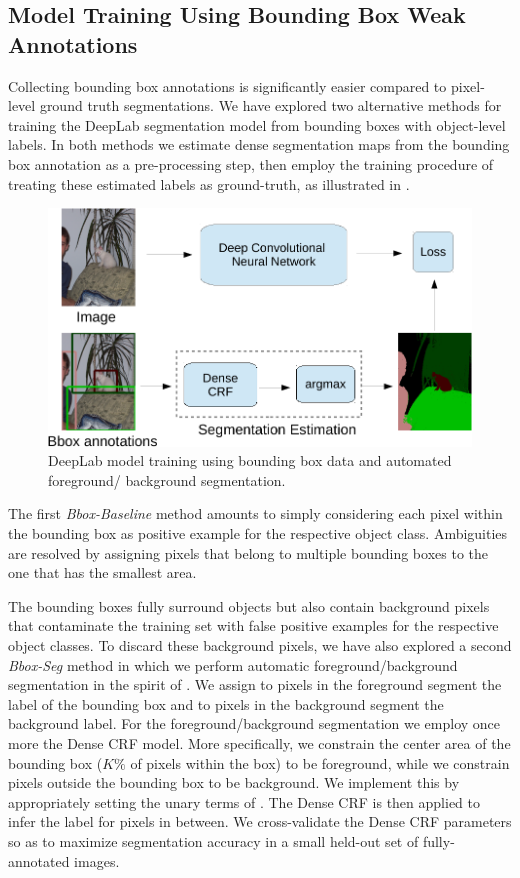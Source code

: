 \subsection{Model Training Using Bounding Box Weak Annotations}
\label{sec:train_bbox}

Collecting bounding box annotations is significantly easier compared
to pixel-level ground truth segmentations. We have explored two
alternative methods for training the DeepLab segmentation model from
bounding boxes with object-level labels. In both methods we estimate
dense segmentation maps from the bounding box annotation as a
pre-processing step, then employ the training procedure of
 treating these estimated labels as
ground-truth, as illustrated in .

\begin{figure}[htbp!]
  \centering
  \includegraphics[width=0.9\linewidth]{fig/model_train_bbox.pdf} 
  \caption{DeepLab model training using bounding box data and
    automated foreground/ background segmentation.}
  \label{fig:model_train_bbox}
\end{figure}

The first \textsl{Bbox-Baseline} method amounts to simply considering
each pixel within the bounding box as positive example for the
respective object class. Ambiguities are resolved by assigning pixels
that belong to multiple bounding boxes to the one that has the
smallest area.

The bounding boxes fully surround objects but also contain background
pixels that contaminate the training set with false positive examples
for the respective object classes. To discard these background pixels,
we have also explored a second \textsl{Bbox-Seg} method in which we
perform automatic foreground/background segmentation in the spirit of
\citet{rother2004grabcut}. We assign to pixels in the foreground
segment the label of the bounding box and to pixels in the background 
segment the background label. For the foreground/background
segmentation we employ once more the Dense CRF model. More
specifically, we constrain the center area of the bounding box ($K\%$
of pixels within the box) to be foreground, while we constrain pixels
outside the bounding box to be background. We implement this by
appropriately setting the unary terms of . The
Dense CRF is then applied to infer the label for pixels in between. We
cross-validate the Dense CRF parameters so as to maximize segmentation
accuracy in a small held-out set of fully-annotated images.

